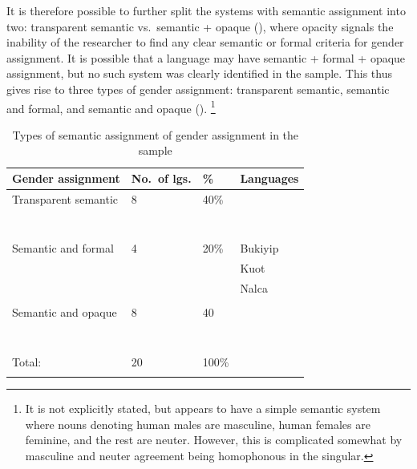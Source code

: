 \documentclass[output=collectionpaper]{langsci/langscibook}
\begin{document}
It is therefore possible to further split the systems with semantic assignment into two: transparent semantic vs.\ semantic + opaque (), where opacity signals the inability of the researcher to find any clear semantic or formal criteria for gender assignment. It is possible that a language may have semantic + formal + opaque assignment, but no such system was clearly identified in the sample. This thus gives rise to three types of gender assignment: transparent semantic, semantic and formal, and semantic and opaque ().%
\footnote{%
It is not explicitly stated, but  \citep{Scorza1985} appears to have a simple semantic system where nouns denoting human males are masculine, human females are feminine, and the rest are neuter. However, this is complicated somewhat by masculine and neuter agreement being homophonous in the singular.
}

\begin{table}[t]
\begin{tabularx}{\textwidth}{lYYl}
\lsptoprule
Gender assignment & No.\ of lgs. & \% & Languages\\
\midrule
Transparent semantic & 8 & 40\% &   \\
&&&                               \\
&&&                                 \\
&&&                                \\
&&&                              \\
&&&                                 \\
&&&                                \\
&&&\\
Semantic and formal & 4 & 20\% & {Bukiyip}   \\
&&&{Kuot}   \\
&&&{Nalca}\\
&&&\\
Semantic and opaque &  8 & 40 & \\
&&&                                 \\
&&&                             \\
&&&                             \\
&&&                                \\
&&&                             \\
&&&                                \\
&&&\\
\midrule
Total: & 20 & 100\%  & \\
\lspbottomrule
\end{tabularx}
\caption{Types of semantic assignment of gender assignment in the sample}
\label{tab:Svard:5}
\end{table}
\end{document}
